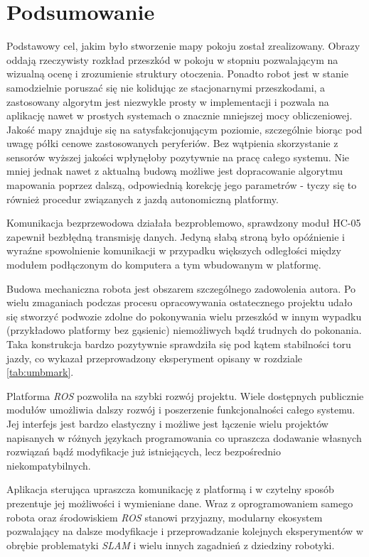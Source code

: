 \chapter{Podsumowanie}

Podstawowy cel, jakim było stworzenie mapy pokoju został zrealizowany. Obrazy oddają rzeczywisty rozkład przeszkód w pokoju w stopniu pozwalającym na wizualną ocenę i zrozumienie struktury otoczenia. Ponadto robot jest w stanie samodzielnie poruszać się nie kolidując ze stacjonarnymi przeszkodami, a zastosowany algorytm jest niezwykle prosty w implementacji i pozwala na aplikację nawet w prostych systemach o znacznie mniejszej mocy obliczeniowej. Jakość mapy znajduje się na satysfakcjonującym poziomie, szczególnie biorąc pod uwagę półki cenowe zastosowanych peryferiów. Bez wątpienia skorzystanie z sensorów wyższej jakości wpłynęłoby pozytywnie na pracę całego systemu. Nie mniej jednak nawet z aktualną budową możliwe jest dopracowanie algorytmu mapowania poprzez dalszą, odpowiednią korekcję jego parametrów - tyczy się to również procedur związanych z jazdą autonomiczną platformy.

Komunikacja bezprzewodowa działała bezproblemowo, sprawdzony moduł HC-05 zapewnił bezbłędną transmisję danych. Jedyną słabą stroną było opóźnienie i wyraźne spowolnienie komunikacji w przypadku większych odległości między modułem podłączonym do komputera a tym wbudowanym w platformę. 

Budowa mechaniczna robota jest obszarem szczególnego zadowolenia autora. Po wielu zmaganiach podczas procesu opracowywania ostatecznego projektu udało się stworzyć podwozie zdolne do pokonywania wielu przeszkód w innym wypadku (przykładowo platformy bez gąsienic) niemożliwych bądź trudnych do pokonania. Taka konstrukcja bardzo pozytywnie sprawdziła się pod kątem stabilności toru jazdy, co wykazał przeprowadzony eksperyment opisany w rozdziale \ref{tab:umbmark}.

Platforma \emph{ROS} pozwoliła na szybki rozwój projektu. Wiele dostępnych publicznie modułów umożliwia dalszy rozwój i poszerzenie funkcjonalności całego systemu. Jej interfejs jest bardzo elastyczny i możliwe jest łączenie wielu projektów napisanych w różnych językach programowania co upraszcza dodawanie własnych rozwiązań bądź modyfikacje już istniejących, lecz bezpośrednio niekompatybilnych.

Aplikacja sterująca upraszcza komunikację z platformą i w czytelny sposób prezentuje jej możliwości i wymieniane dane. Wraz z oprogramowaniem samego robota oraz środowiskiem \emph{ROS} stanowi przyjazny, modularny ekosystem pozwalający na dalsze modyfikacje i przeprowadzanie kolejnych eksperymentów w obrębie problematyki \emph{SLAM} i wielu innych zagadnień z dziedziny robotyki.